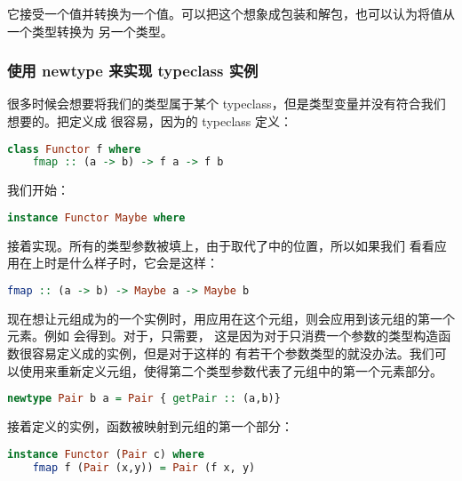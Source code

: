 \documentclass[./main.tex]{subfiles}
\begin{document}
它接受一个值并转换为一个\acode{[Char]}值。可以把这个想象成包装和解包，也可以认为将值从一个类型转换为
另一个类型。

\subsubsection*{使用 newtype 来实现 typeclass 实例}

很多时候会想要将我们的类型属于某个 typeclass，但是类型变量并没有符合我们想要的。把定义成
很容易，因为的 typeclass 定义：

\begin{lstlisting}[language=Haskell]
  class Functor f where
    fmap :: (a -> b) -> f a -> f b
\end{lstlisting}

我们开始：

\begin{lstlisting}[language=Haskell]
  instance Functor Maybe where
\end{lstlisting}

接着实现。所有的类型参数被填上，由于取代了中的位置，所以如果我们
看看应用在上时是什么样子时，它会是这样：

\begin{lstlisting}[language=Haskell]
  fmap :: (a -> b) -> Maybe a -> Maybe b
\end{lstlisting}

现在想让元组成为的一个实例时，用应用在这个元组，则会应用到该元组的第一个元素。例如
会得到。对于，只需要，
这是因为对于\textbf{}{只消费一个参数}的类型构造函数很容易定义成的实例，但是对于这样的
有若干个参数类型的就没办法。我们可以使用来重新定义元组，使得第二个类型参数代表了元组中的第一个元素部分。

\begin{lstlisting}[language=Haskell]
  newtype Pair b a = Pair { getPair :: (a,b)}
\end{lstlisting}

接着定义的实例，函数被映射到元组的第一个部分：

\begin{lstlisting}[language=Haskell]
  instance Functor (Pair c) where
    fmap f (Pair (x,y)) = Pair (f x, y)
\end{lstlisting}
\end{document}
